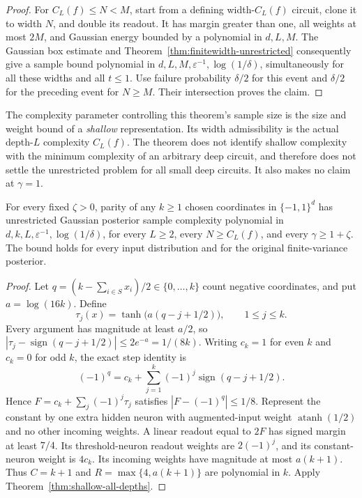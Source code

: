 \begin{proof}
For $C_L(f)\le N<M$, start from a defining width-$C_L(f)$ circuit,
clone it to width $N$, and double its readout. It has margin greater
than one, all weights at most $2M$, and Gaussian energy bounded by a
polynomial in $d,L,M$. The Gaussian box estimate and
Theorem~\ref{thm:finitewidth-unrestricted} consequently give a sample
bound polynomial in $d,L,M,\varepsilon^{-1},\log(1/\delta)$,
simultaneously for all these widths and all $t\le1$.
Use failure probability $\delta/2$ for this event and $\delta/2$ for
the preceding event for $N\ge M$. Their intersection proves the claim.
\end{proof}

The complexity parameter controlling this theorem's sample size is the
size and weight bound of a \emph{shallow} representation. Its width
admissibility is the actual depth-$L$ complexity $C_L(f)$. The theorem
does not identify shallow complexity with the minimum complexity of an
arbitrary deep circuit, and therefore does not settle the unrestricted
problem for all small deep circuits. It also makes no claim at $\gamma=1$.

\begin{corollary}
\label{cor:parity-full-polynomial}
For every fixed $\zeta>0$, parity of any $k\ge1$ chosen coordinates in
$\{-1,1\}^d$ has unrestricted Gaussian posterior sample complexity
polynomial in $d,k,L,\varepsilon^{-1},\log(1/\delta)$, for every
$L\ge2$, every $N\ge C_L(f)$, and every $\gamma\ge1+\zeta$.
The bound holds for every input distribution and for the original
finite-variance posterior.
\end{corollary}

\begin{proof}
Let $q=(k-\sum_{i\in S}x_i)/2\in\{0,\ldots,k\}$ count negative
coordinates, and put $a=\log(16k)$. Define
\[
 \tau_j(x)=\tanh\bigl(a(q-j+1/2)\bigr),\qquad 1\le j\le k.
\]
Every argument has magnitude at least $a/2$, so
$|\tau_j-\operatorname{sign}(q-j+1/2)|\le2e^{-a}=1/(8k)$.
Writing $c_k=1$ for even $k$ and $c_k=0$ for odd $k$, the exact step
identity is
\[
 (-1)^q=c_k+\sum_{j=1}^k(-1)^j
                  \operatorname{sign}(q-j+1/2).
\]
Hence $F=c_k+\sum_j(-1)^j\tau_j$ satisfies
$|F-(-1)^q|\le1/8$. Represent the constant by one extra hidden neuron
with augmented-input weight $\operatorname{atanh}(1/2)$ and no other
incoming weights. A linear readout equal to $2F$ has signed margin
at least $7/4$. Its threshold-neuron readout weights are $2(-1)^j$,
and its constant-neuron weight is $4c_k$.
Its incoming weights have magnitude at most $a(k+1)$.
Thus $C=k+1$ and $R=\max\{4,a(k+1)\}$ are polynomial in $k$.
Apply Theorem~\ref{thm:shallow-all-depths}.
\end{proof}

